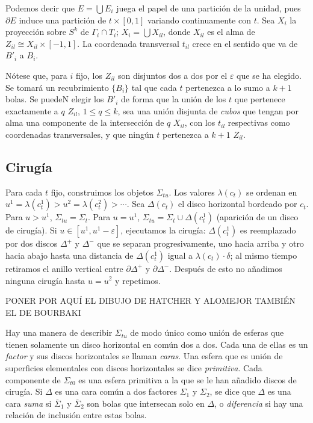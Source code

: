 \documentclass[twoside, 11pt]{article}
\begin{document}
Podemos decir que $E=\bigcup E_i$ juega el papel de una partición de la unidad, pues $\partial E$ induce una partición de $t\times [0,1]$ variando continuamente con $t$. Sea $X_i$ la proyección sobre $S^k$ de $\Gamma_i\cap T_i$; $X_i=\bigcup X_{il}$, donde $X_{il}$ es el alma de $Z_{il}\cong X_{il}\times [-1,1]$. La coordenada transversal $t_{il}$ crece en el sentido que va de $B'_i$ a $B_i$. 

Nótese que, para $i$ fijo, los $Z_{il}$ son disjuntos dos a dos por el $\varepsilon$ que se ha elegido. Se tomará un recubrimiento $\{B_i\}$ tal que cada $t$ pertenezca a lo sumo a $k+1$ bolas. Se puedeN elegir los $B'_i$ de forma que la unión de los $t$ que pertenece exactamente a $q$ $Z_{il}$, $1\leq q\leq k$, sea una unión disjunta de \emph{cubos} que tengan por alma una componente de la intersección de $q$ $X_{il}$, con los $t_{il}$ respectivas como coordenadas transversales, y que ningún $t$ pertenezca a $k+1$ $Z_{il}$. 

\subsection{Cirugía}
Para cada $t$ fijo, construimos los objetos $\Sigma_{tu}$. Los valores $\lambda(c_t)$ se ordenan en $u^1=\lambda(c_t^1)>u^2=\lambda(c_t^2)>\cdots$. Sea $\Delta(c_t)$ el disco horizontal bordeado por $c_t$. Para $u>u^1$, $\Sigma_{tu}=\Sigma_t$. Para $u=u^1$, $\Sigma_{tu}=\Sigma_t\cup \Delta(c_t^1)$ (aparición de un disco de cirugía). Si $u\in[u^1, u^1-\varepsilon]$, ejecutamos la cirugía: $\Delta(c_t^1)$ es reemplazado por dos discos $\Delta^+$ y $\Delta^-$ que se separan progresivamente, uno hacia arriba y otro hacia abajo hasta una distancia de $\Delta(c_t^1)$ igual a $\lambda(c_t)\cdot\delta$; al mismo tiempo retiramos el anillo vertical entre $\partial\Delta^+$ y $\partial\Delta^-$. Después de esto no añadimos ninguna cirugía hasta $u=u^2$ y repetimos. 

PONER POR AQUÍ EL DIBUJO DE HATCHER Y ALOMEJOR TAMBIÉN EL DE BOURBAKI

Hay una manera de describir $\Sigma_{tu}$ de modo único como unión de esferas que tienen solamente un disco horizontal en común dos a dos. Cada una de ellas es un \emph{factor} y sus discos horizontales se llaman \emph{caras}. Una esfera que es unión de superficies elementales con discos horizontales se dice \emph{primitiva}. Cada componente de $\Sigma_{t0}$ es una esfera primitiva a la que se le han añadido discos de cirugía. Si $\Delta$ es una cara común a dos factores $\Sigma_1$ y $\Sigma_2$, se dice que $\Delta$ es una cara \emph{suma} si $\overline{\Sigma}_1$ y $\overline{\Sigma}_2$ son bolas que intersecan solo en $\Delta$, o \emph{diferencia} si hay una relación de inclusión entre estas bolas. 
\end{document}

